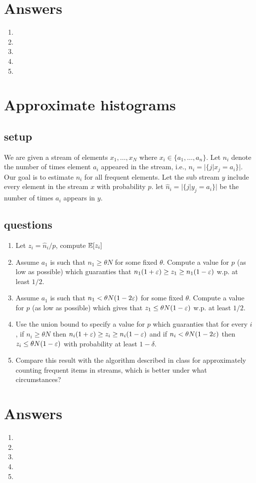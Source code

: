 \documentclass{article}
\begin{document}
\section{Answers}
\begin{enumerate}
\item
\item
\item
\item
\item
\end{enumerate}

\section{Approximate histograms}
\subsection*{setup}
We are given a stream of elements $x_1,\ldots, x_N$ where $x_i \in \{a_1,\ldots,a_n\}$.
Let $n_i$ denote the number of times element $a_i$ appeared in the stream, i.e., $n_i = |\{ j | x_j = a_i \}|$.
Our goal is to estimate $n_i$ for all frequent elements.
Let the sub stream $y$ include every element in the stream $x$ with probability $p$.
let $\hat{n}_i = |\{ j | y_j = a_i \}|$ be the number of times $a_i$ appears in $y$.  
\subsection*{questions}
\begin{enumerate}
\item Let $z_i = \hat{n}_{i}/p$, compute ${\mathbb E}[z_i]$
\item Assume $a_1$ is such that $n_1 \ge \theta N$ for some fixed $\theta$.
Compute a value for $p$ (as low as possible) which guaranties that $n_1 (1+\varepsilon)\ge z_1 \ge n_1 (1-\varepsilon)$ w.p. at least $1/2$. 
\item Assume $a_1$ is such that $n_1 < \theta N(1-2\varepsilon)$ for some fixed $\theta$.
Compute a value for $p$ (as low as possible) which gives that $z_1 \le \theta N(1-\varepsilon)$ w.p. at least $1/2$. 
\item Use the union bound to specify a value for $p$ which guaranties that for every $i$, if $n_i \ge \theta N$
then $n_i (1+\varepsilon)\ge z_i \ge n_i (1-\varepsilon)$ and if $n_i < \theta N (1-2\varepsilon)$ then $z_i \le \theta N (1-\varepsilon)$ with probability at least $1-\delta$. 
\item Compare this result with the algorithm described in class for approximately counting frequent items in streams, which is better under what circumstances?
\end{enumerate}



\section{Answers}
\begin{enumerate}
\item
\item
\item
\item
\item
\end{enumerate}
\end{document}

